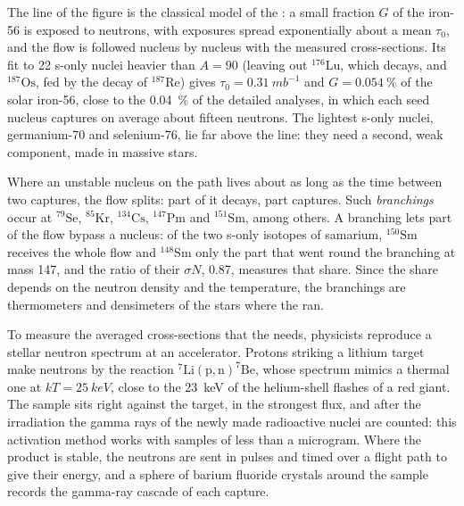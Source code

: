 The line of the figure is the classical model of the : a small
fraction $G$ of the iron-56 is exposed to neutrons, with exposures spread
exponentially about a mean $\tau_0$, and the flow is followed nucleus by
nucleus with the measured cross-sections. Its fit to 22 s-only
nuclei heavier than $A = 90$ (leaving out $^{176}\mathrm{Lu}$, which
decays, and $^{187}\mathrm{Os}$, fed by the decay of
$^{187}\mathrm{Re}$) gives $\tau_0 = \qty{0.31}{mb^{-1}}$ and
$G = \qty{0.054}{\percent}$ of the solar iron-56, close to the
\qty{0.04}{\percent} of the detailed analyses, in which each seed
nucleus captures on average about fifteen neutrons. The lightest s-only
nuclei, germanium-70 and selenium-76, lie far above the line: they need
a second, weak component, made in massive stars.

Where an unstable nucleus on the path lives about as long as the time
between two captures, the flow splits: part of it decays, part captures.
Such \emph{branchings} occur at $^{79}\mathrm{Se}$, $^{85}\mathrm{Kr}$,
$^{134}\mathrm{Cs}$, $^{147}\mathrm{Pm}$ and $^{151}\mathrm{Sm}$, among
others. A branching lets part of the flow bypass a nucleus: of the two
s-only isotopes of samarium, $^{150}\mathrm{Sm}$ receives the whole
flow and $^{148}\mathrm{Sm}$ only the part that went round the
branching at mass 147, and the ratio of their $\sigma N$, \num{0.87},
measures that share. Since the share depends on the neutron density and
the temperature, the branchings are thermometers and densimeters of the
stars where the  ran.

\begin{inthelab}
To measure the averaged cross-sections that the  needs,
physicists reproduce a stellar neutron spectrum at an accelerator.
Protons striking a lithium target make neutrons by the reaction
$^{7}\mathrm{Li}(\mathrm{p},\mathrm{n})^{7}\mathrm{Be}$, whose spectrum
mimics a thermal one at $kT = \qty{25}{keV}$, close to the
\qty{23}{keV} of the helium-shell flashes of a red giant. The sample sits
right against the target, in the strongest flux, and after the
irradiation the gamma rays of the newly made radioactive nuclei are
counted: this activation method works with samples of less than a
microgram. Where the product is stable, the neutrons are sent in pulses
and timed over a flight path to give their energy, and a sphere of
barium fluoride crystals around the sample records the gamma-ray
cascade of each capture.
\end{inthelab}


